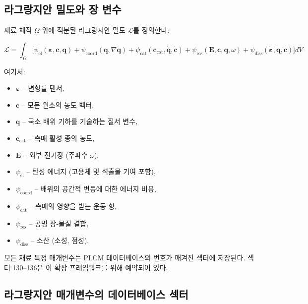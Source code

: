\documentclass[12pt,a4paper]{article}
\begin{document}
	\subsection{라그랑지안 밀도와 장 변수}
	\label{subsec:lagrangian-density}
	
	재료 체적 $\Omega$ 위에 적분된 라그랑지안 밀도 $\mathcal{L}$를 정의한다:
	
	\[
	\mathcal{L} = \int_{\Omega} \Big[ 
	\psi_{\mathrm{el}}(\boldsymbol{\varepsilon}, \mathbf{c}, \mathbf{q}) 
	+ \psi_{\mathrm{coord}}(\mathbf{q}, \nabla\mathbf{q}) 
	+ \psi_{\mathrm{cat}}(\mathbf{c}_{\mathrm{cat}}, \dot{\mathbf{q}}, \dot{\mathbf{c}}) 
	+ \psi_{\mathrm{res}}(\mathbf{E}, \mathbf{c}, \mathbf{q}, \omega) 
	+ \psi_{\mathrm{diss}}(\dot{\boldsymbol{\varepsilon}}, \dot{\mathbf{q}}, \dot{\mathbf{c}})
	\Big] dV
	\]
	
	여기서:
	\begin{itemize}
		\item $\boldsymbol{\varepsilon}$ – 변형률 텐서,
		\item $\mathbf{c}$ – 모든 원소의 농도 벡터,
		\item $\mathbf{q}$ – 국소 배위 기하를 기술하는 질서 변수,
		\item $\mathbf{c}_{\mathrm{cat}}$ – 촉매 활성 종의 농도,
		\item $\mathbf{E}$ – 외부 전기장 (주파수 $\omega$),
		\item $\psi_{\mathrm{el}}$ – 탄성 에너지 (고용체 및 석출물 기여 포함),
		\item $\psi_{\mathrm{coord}}$ – 배위의 공간적 변동에 대한 에너지 비용,
		\item $\psi_{\mathrm{cat}}$ – 촉매의 영향을 받는 운동 항,
		\item $\psi_{\mathrm{res}}$ – 공명 장-물질 결합,
		\item $\psi_{\mathrm{diss}}$ – 소산 (소성, 점성).
	\end{itemize}
	
	모든 재료 특정 매개변수는 PLCM 데이터베이스의 번호가 매겨진 섹터에 저장된다. 섹터 130–136은 이 확장 프레임워크를 위해 예약되어 있다.
	
	\subsection{라그랑지안 매개변수의 데이터베이스 섹터}
	\label{subsec:sectors}
	
\end{document}
